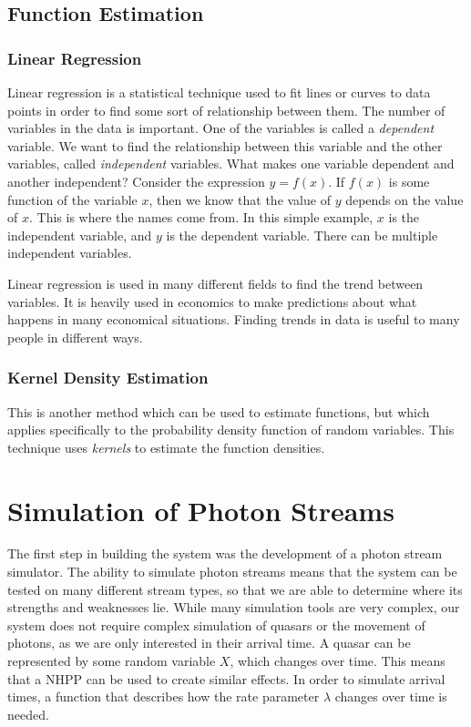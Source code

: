 \documentclass[a4paper,11pt]{article}
\begin{document}
\subsection{Function Estimation}
\label{sec-2-3}
\subsubsection{Linear Regression}
\label{sec-2-3-1}

Linear regression is a statistical technique used to fit lines or curves to data
points in order to find some sort of relationship between them. The number of
variables in the data is important. One of the variables is called a \emph{dependent}
variable. We want to find the relationship between this variable and the other
variables, called \emph{independent} variables. What makes one variable
dependent and another independent? Consider the expression $y=f(x)$. If $f(x)$
is some function of the variable $x$, then we know that the value of $y$ depends
on the value of $x$. This is where the names come from. In this simple example,
$x$ is the independent variable, and $y$ is the dependent variable. There can be
multiple independent variables.

 Linear regression is used in many different fields to find the trend between
 variables. It is heavily used in economics to make predictions about what
 happens in many economical situations. Finding trends in data is useful to many
 people in different ways.
\subsubsection{Kernel Density Estimation}
\label{sec-2-3-2}

This is another method which can be used to estimate functions, but which
applies specifically to the probability density function of random
variables. This technique uses \emph{kernels} to estimate the function
densities. 
\section{Simulation of Photon Streams}
\label{sec-3}

The first step in building the system was the development of a photon stream
simulator. The ability to simulate photon streams means that the system can be
tested on many different stream types, so that we are able to determine where
its strengths and weaknesses lie. While many simulation tools are very complex,
our system does not require complex simulation of quasars or the movement of
photons, as we are only interested in their arrival time. A quasar can be
represented by some random variable $X$, which changes over time. This means
that a NHPP can be used to create similar effects. In order to simulate arrival
times, a function that describes how the rate parameter $\lambda$ changes over
time is needed. 
\end{document}
